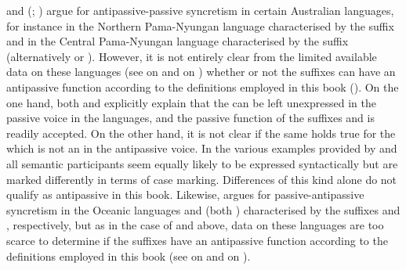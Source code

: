 \citet[151f.]{dixon:1994} and \citeauthor{dixon:aikhenvald:2000} (\citeyear[11]{dixon:aikhenvald:2000}; \citeyear[51]{dixon:aikhenvald:2011}) argue for antipas\-sive-passive syncretism in certain Australian languages, for instance in the Northern Pama-Nyungan language  characterised by the suffix  and in the Central Pama-Nyungan language  characterised by the suffix  (alternatively  or ). However, it is not entirely clear from the limited available data on these languages (see \citealt{patz:2002} on  and \citealt{austin:2013} on ) whether or not the suffixes can have an antipassive function according to the definitions employed in this book (). On the one hand, both \citet[148]{patz:2002} and \citet[162]{austin:2013} explicitly explain that the  can be left unexpressed in the passive voice in the languages, and the passive function of the suffixes  and  is readily accepted. On the other hand, it is not clear if the same holds true for the  which is not an  in the antipassive voice. In the various examples provided by  \citet[151]{patz:2002} and \citet[160]{austin:2013} all semantic participants seem equally likely to be expressed syntactically but are marked differently in terms of  case marking. Differences of this kind alone do not qualify as antipassive in this book. Likewise, \citet{janic:2016} argues for passive-antipassive syncretism in the Oceanic languages  and  (both ) characterised by the suffixes  and , respectively, but as in the case of  and  above, data on these languages are too scarce to determine if the suffixes have an antipassive function according to the definitions employed in this book (see \citealt{harrison:1976} on  and \citealt{schlie:1983} on ). 

